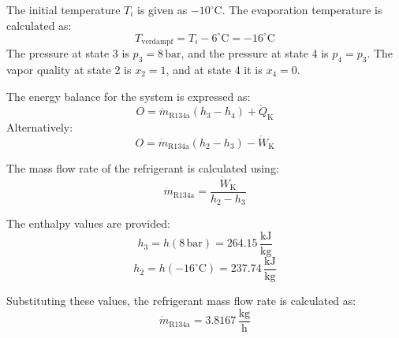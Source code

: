 The initial temperature \(T_i\) is given as \(-10^\circ\text{C}\). The evaporation temperature is calculated as:  
\[
T_{\text{verdampf}} = T_i - 6^\circ\text{C} = -16^\circ\text{C}
\]  
The pressure at state 3 is \(p_3 = 8 \, \text{bar}\), and the pressure at state 4 is \(p_4 = p_3\). The vapor quality at state 2 is \(x_2 = 1\), and at state 4 it is \(x_4 = 0\).  

The energy balance for the system is expressed as:  
\[
O = \dot{m}_{\text{R134a}} (h_3 - h_4) + \dot{Q}_{\text{K}}
\]  
Alternatively:  
\[
O = \dot{m}_{\text{R134a}} (h_2 - h_3) - \dot{W}_{\text{K}}
\]  

The mass flow rate of the refrigerant is calculated using:  
\[
\dot{m}_{\text{R134a}} = \frac{\dot{W}_{\text{K}}}{h_2 - h_3}
\]  

The enthalpy values are provided:  
\[
h_3 = h(8 \, \text{bar}) = 264.15 \, \frac{\text{kJ}}{\text{kg}}
\]  
\[
h_2 = h(-16^\circ\text{C}) = 237.74 \, \frac{\text{kJ}}{\text{kg}}
\]  

Substituting these values, the refrigerant mass flow rate is calculated as:  
\[
\dot{m}_{\text{R134a}} = 3.8167 \, \frac{\text{kg}}{\text{h}}
\]